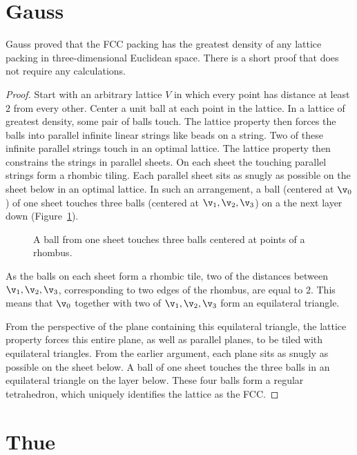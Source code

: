 \section{Gauss}

Gauss proved that the FCC packing has the greatest density
of any lattice packing in three-dimensional Euclidean space.  There is a
short proof that does not require any calculations.

\begin{proof}
Start with an arbitrary lattice $V$ in which every point has distance 
at least $2$ from every other.  Center a unit ball at each point in
the lattice.  In a lattice of greatest density, some pair of balls
touch.  The lattice property then forces the balls into parallel
infinite linear strings like beads on a string.  Two of these infinite
parallel strings touch in an optimal lattice.  The
lattice property then constrains the strings in parallel sheets.  On
each sheet the touching parallel strings form a rhombic tiling.  Each
parallel sheet sits as snugly as possible on the sheet below in an optimal
lattice.  In such an arrangement, a ball (centered at
$\v_0$) of one sheet touches three balls (centered at
$\v_1,\v_2,\v_3$) on a the next layer down (Figure~\ref{fig:rhombus}).

\begin{figure}[htb]
  \centering
  \caption{A ball from one sheet touches three balls centered at points of a rhombus.}
  \label{fig:rhombus}
\end{figure}

As the balls on each sheet form a rhombic tile, two of the distances
between $\v_1,\v_2,\v_3$, corresponding to two edges of the rhombus, are
equal to $2$.  This means that $\v_0$ together with two of
$\v_1,\v_2,\v_3$ form an equilateral triangle.  

From the perspective of
the plane containing this equilateral triangle, the lattice property
forces this entire plane, as well as parallel planes, to be tiled with
equilateral triangles.  From the earlier argument, each plane sits as
snugly as possible on the sheet below.  A ball of one sheet touches
the three balls in an equilateral triangle on the layer below.
These four balls form a regular tetrahedron, which
uniquely identifies the lattice as the FCC.
\end{proof}






\section{Thue}\label{sec:thue}


